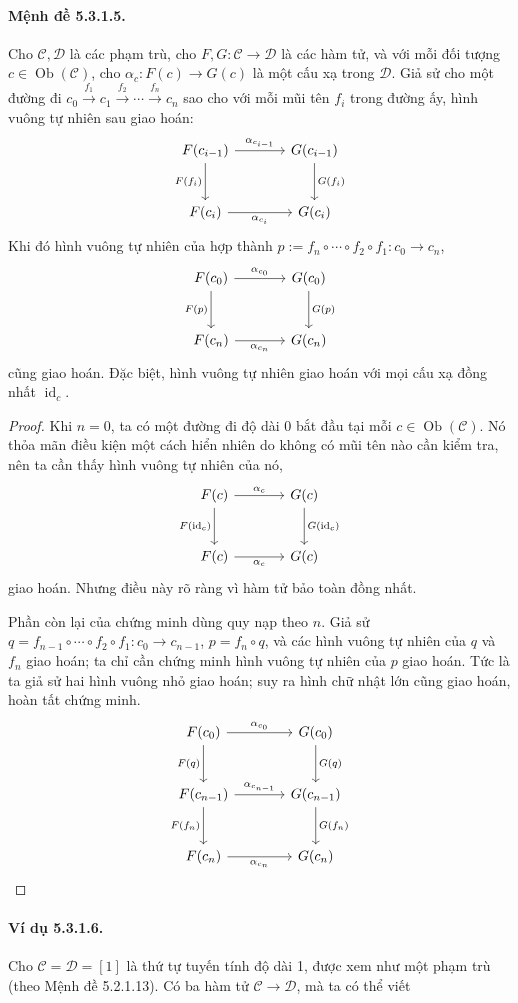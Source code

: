 \paragraph{Mệnh đề 5.3.1.5.} Cho $\mathcal C,\mathcal D$ là các phạm trù, cho $F,G:\mathcal C\to\mathcal D$ là các hàm tử, và với mỗi đối tượng $c\in\operatorname{Ob}(\mathcal C)$, cho $\alpha_c:F(c)\to G(c)$ là một cấu xạ trong $\mathcal D$. Giả sử cho một đường đi $c_0\xrightarrow{f_1}c_1\xrightarrow{f_2}\cdots\xrightarrow{f_n}c_n$ sao cho với mỗi mũi tên $f_i$ trong đường ấy, hình vuông tự nhiên sau giao hoán:
\[\begin{tikzcd}[column sep=large,row sep=large]
F(c_{i-1})\arrow[r,"\alpha_{c_{i-1}}"]\arrow[d,"F(f_i)"']&G(c_{i-1})\arrow[d,"G(f_i)"]\\
F(c_i)\arrow[r,"\alpha_{c_i}"']&G(c_i)
\end{tikzcd}\]
Khi đó hình vuông tự nhiên của hợp thành $p:=f_n\circ\cdots\circ f_2\circ f_1:c_0\to c_n$,
\[\begin{tikzcd}[column sep=large,row sep=large]
F(c_0)\arrow[r,"\alpha_{c_0}"]\arrow[d,"F(p)"']&G(c_0)\arrow[d,"G(p)"]\\
F(c_n)\arrow[r,"\alpha_{c_n}"']&G(c_n)
\end{tikzcd}\]
cũng giao hoán. Đặc biệt, hình vuông tự nhiên giao hoán với mọi cấu xạ đồng nhất $\operatorname{id}_c$.
\begin{proof}Khi $n=0$, ta có một đường đi độ dài 0 bắt đầu tại mỗi $c\in\operatorname{Ob}(\mathcal C)$. Nó thỏa mãn điều kiện một cách hiển nhiên do không có mũi tên nào cần kiểm tra, nên ta cần thấy hình vuông tự nhiên của nó,
\[\begin{tikzcd}[column sep=large,row sep=large]
F(c)\arrow[r,"\alpha_c"]\arrow[d,"F(\operatorname{id}_c)"']&G(c)\arrow[d,"G(\operatorname{id}_c)"]\\
F(c)\arrow[r,"\alpha_c"']&G(c)
\end{tikzcd}\]
giao hoán. Nhưng điều này rõ ràng vì hàm tử bảo toàn đồng nhất.

Phần còn lại của chứng minh dùng quy nạp theo $n$. Giả sử $q=f_{n-1}\circ\cdots\circ f_2\circ f_1:c_0\to c_{n-1}$, $p=f_n\circ q$, và các hình vuông tự nhiên của $q$ và $f_n$ giao hoán; ta chỉ cần chứng minh hình vuông tự nhiên của $p$ giao hoán. Tức là ta giả sử hai hình vuông nhỏ giao hoán; suy ra hình chữ nhật lớn cũng giao hoán, hoàn tất chứng minh.
\[\begin{tikzcd}[column sep=large,row sep=large]
F(c_0)\arrow[r,"\alpha_{c_0}"]\arrow[d,"F(q)"']&G(c_0)\arrow[d,"G(q)"]\\
F(c_{n-1})\arrow[r,"\alpha_{c_{n-1}}"]\arrow[d,"F(f_n)"']&G(c_{n-1})\arrow[d,"G(f_n)"]\\
F(c_n)\arrow[r,"\alpha_{c_n}"']&G(c_n)
\end{tikzcd}\]
\end{proof}
\paragraph{Ví dụ 5.3.1.6.} Cho $\mathcal C=\mathcal D=[1]$ là thứ tự tuyến tính độ dài 1, được xem như một phạm trù (theo Mệnh đề 5.2.1.13). Có ba hàm tử $\mathcal C\to\mathcal D$, mà ta có thể viết
